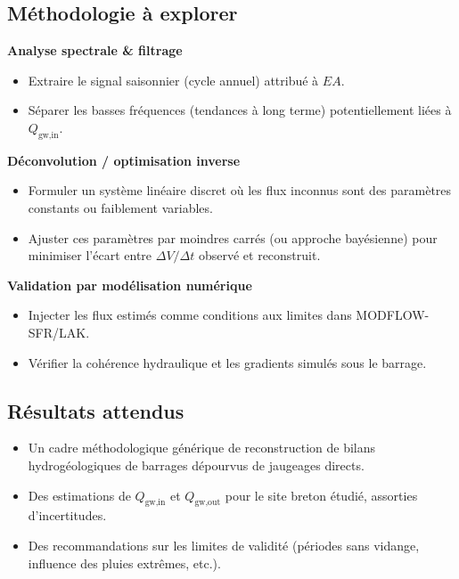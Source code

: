 \subsection{Méthodologie à explorer}
\label{sec:methodologie_explorer}

\noindent\textbf{Analyse spectrale \& filtrage}
\begin{itemize}[leftmargin=1.5em]
    \item Extraire le signal saisonnier (cycle annuel) attribué à $E A$.
    \item Séparer les basses fréquences (tendances à long terme) potentiellement liées à $Q_{\text{gw,in}}$.
\end{itemize}

\vspace{1em}

\noindent\textbf{Déconvolution / optimisation inverse}
\begin{itemize}[leftmargin=1.5em]
    \item Formuler un système linéaire discret où les flux inconnus sont des paramètres constants ou faiblement variables.
    \item Ajuster ces paramètres par moindres carrés (ou approche bayésienne) pour minimiser l’écart entre $\Delta V / \Delta t$ observé et reconstruit.
\end{itemize}

\vspace{1em}

\noindent\textbf{Validation par modélisation numérique}
\begin{itemize}[leftmargin=1.5em]
    \item Injecter les flux estimés comme conditions aux limites dans MODFLOW-SFR/LAK.
    \item Vérifier la cohérence hydraulique et les gradients simulés sous le barrage.
\end{itemize}

\subsection{Résultats attendus}
\label{sec:resultats_attendus}

\begin{itemize}[leftmargin=1.5em]
    \item Un cadre méthodologique générique de reconstruction de bilans hydrogéologiques de barrages dépourvus de jaugeages directs.
    \item Des estimations de $Q_{\text{gw,in}}$ et $Q_{\text{gw,out}}$ pour le site breton étudié, assorties d’incertitudes.
    \item Des recommandations sur les limites de validité (périodes sans vidange, influence des pluies extrêmes, etc.).
\end{itemize}

